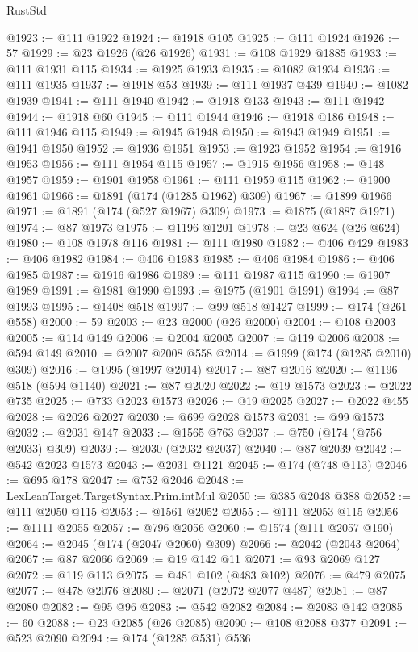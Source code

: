 \begin{lexlean}{RustStd}
\begin{coremodule}
@1923 := @111 @1922
@1924 := @1918 @105
@1925 := @111 @1924
@1926 := 57
@1929 := @23 @1926 (@26 @1926)
@1931 := @108 @1929 @1885
@1933 := @111 @1931 @115
@1934 := @1925 @1933
@1935 := @1082 @1934
@1936 := @111 @1935
@1937 := @1918 @53
@1939 := @111 @1937 @439
@1940 := @1082 @1939
@1941 := @111 @1940
@1942 := @1918 @133
@1943 := @111 @1942
@1944 := @1918 @60
@1945 := @111 @1944
@1946 := @1918 @186
@1948 := @111 @1946 @115
@1949 := @1945 @1948
@1950 := @1943 @1949
@1951 := @1941 @1950
@1952 := @1936 @1951
@1953 := @1923 @1952
@1954 := @1916 @1953
@1956 := @111 @1954 @115
@1957 := @1915 @1956
@1958 := @148 @1957
@1959 := @1901 @1958
@1961 := @111 @1959 @115
@1962 := @1900 @1961
@1966 := @1891 (@174 (@1285 @1962) @309)
@1967 := @1899 @1966
@1971 := @1891 (@174 (@527 @1967) @309)
@1973 := @1875 (@1887 @1971)
@1974 := @87 @1973
@1975 := @1196 @1201
@1978 := @23 @624 (@26 @624)
@1980 := @108 @1978 @116
@1981 := @111 @1980
@1982 := @406 @429
@1983 := @406 @1982
@1984 := @406 @1983
@1985 := @406 @1984
@1986 := @406 @1985
@1987 := @1916 @1986
@1989 := @111 @1987 @115
@1990 := @1907 @1989
@1991 := @1981 @1990
@1993 := @1975 (@1901 @1991)
@1994 := @87 @1993
@1995 := @1408 @518
@1997 := @99 @518 @1427
@1999 := @174 (@261 @558)
@2000 := 59
@2003 := @23 @2000 (@26 @2000)
@2004 := @108 @2003
@2005 := @114 @149
@2006 := @2004 @2005
@2007 := @119 @2006
@2008 := @594 @149
@2010 := @2007 @2008 @558
@2014 := @1999 (@174 (@1285 @2010) @309)
@2016 := @1995 (@1997 @2014)
@2017 := @87 @2016
@2020 := @1196 @518 (@594 @1140)
@2021 := @87 @2020
@2022 := @19 @1573
@2023 := @2022 @735
@2025 := @733 @2023 @1573
@2026 := @19 @2025
@2027 := @2022 @455
@2028 := @2026 @2027
@2030 := @699 @2028 @1573
@2031 := @99 @1573
@2032 := @2031 @147
@2033 := @1565 @763
@2037 := @750 (@174 (@756 @2033) @309)
@2039 := @2030 (@2032 @2037)
@2040 := @87 @2039
@2042 := @542 @2023 @1573
@2043 := @2031 @1121
@2045 := @174 (@748 @113)
@2046 := @695 @178
@2047 := @752 @2046
@2048 := LexLeanTarget.TargetSyntax.Prim.intMul
@2050 := @385 @2048 @388
@2052 := @111 @2050 @115
@2053 := @1561 @2052
@2055 := @111 @2053 @115
@2056 := @1111 @2055
@2057 := @796 @2056
@2060 := @1574 (@111 @2057 @190)
@2064 := @2045 (@174 (@2047 @2060) @309)
@2066 := @2042 (@2043 @2064)
@2067 := @87 @2066
@2069 := @19 @142 @11
@2071 := @93 @2069 @127
@2072 := @119 @113
@2075 := @481 @102 (@483 @102)
@2076 := @479 @2075
@2077 := @478 @2076
@2080 := @2071 (@2072 @2077 @487)
@2081 := @87 @2080
@2082 := @95 @96
@2083 := @542 @2082
@2084 := @2083 @142
@2085 := 60
@2088 := @23 @2085 (@26 @2085)
@2090 := @108 @2088 @377
@2091 := @523 @2090
@2094 := @174 (@1285 @531) @536

\end{coremodule}
\end{lexlean}
